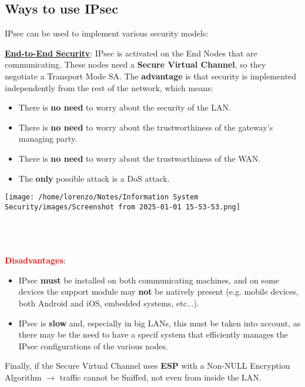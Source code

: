\subsection{Ways to use IPsec}
IPsec can be used to implement various security models:
\begin{itemize}
    \begin{minipage}{0.6\textwidth}
    \item \underline{\textbf{End-to-End Security}}: IPsec is activated on the End Nodes that are communicating. These nodes need a \textbf{Secure
    Virtual Channel}, so they negotiate a Transport Mode SA. The \textbf{advantage} is that security
    is implemented independently from the rest of the network, which means:
    \begin{itemize}
        \item There is \textbf{no need} to worry about the security of the LAN.
        \item There is \textbf{no need} to worry about the trustworthiness of the gateway’s managing party.
        \item There is \textbf{no need} to worry about the trustworthiness of the WAN.
        \item The \textbf{only} possible attack is a DoS attack.
    \end{itemize}
   
    \end{minipage} 
    \hspace{0.2cm}
    \begin{minipage}{0.4\textwidth}
        \centering
        \texttt{[image: /home/lorenzo/Notes/Information System Security/images/Screenshot from 2025-01-01 15-53-53.png]}
    \end{minipage}
    \\    
    \\
    \\
    \textcolor{red}{\textbf{Disadvantages}}: 
    \begin{itemize}
        \item IPsec \textbf{must} be installed on both communicating machines, and on some devices the support module may \textbf{not} be natively present (e.g. mobile devices, both
        Android and iOS, embedded systems, etc...).
        \item IPsec is \textbf{slow} and, especially in big LANs, this must be taken into account, as
        there may be the need to have a specif system that efficiently manages the IPsec configurations
        of the various nodes.
    \end{itemize}
    Finally, if the Secure Virtual Channel uses \textbf{ESP} with a Non-NULL Encryption Algorithm \(\rightarrow \) traffic cannot be Sniffed, not even from inside the LAN.


\end{itemize}
